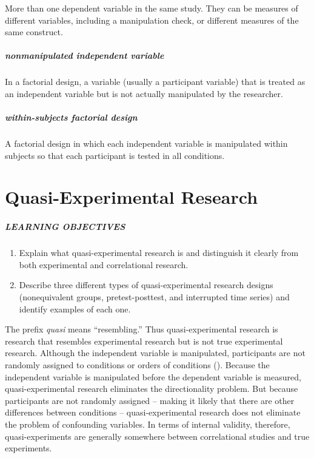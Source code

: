 \documentclass[
]{krantz}
\providecommand{\tightlist}{%
  \setlength{\itemsep}{0pt}\setlength{\parskip}{0pt}}
\begin{document}
More than one dependent variable in the same study. They can be measures of different variables, including a manipulation check, or different measures of the same construct.

\paragraph*{nonmanipulated independent variable}\label{nonmanipulated-independent-variable}

In a factorial design, a variable (usually a participant variable) that is treated as an independent variable but is not actually manipulated by the researcher.

\paragraph*{within-subjects factorial design}\label{within-subjects-factorial-design}

A factorial design in which each independent variable is manipulated within subjects so that each participant is tested in all conditions.

\chapter{Quasi-Experimental Research}\label{quasi-experimental-research}

\paragraph*{LEARNING OBJECTIVES}\label{learning-objectives-16}

\begin{enumerate}
\def\labelenumi{\arabic{enumi}.}
\tightlist
\item
  Explain what quasi-experimental research is and distinguish it clearly from both experimental and correlational research.
\item
  Describe three different types of quasi-experimental research designs (nonequivalent groups, pretest-posttest, and interrupted time series) and identify examples of each one.
\end{enumerate}

The prefix \emph{quasi} means ``resembling.'' Thus quasi-experimental research is research that resembles experimental research but is not true experimental research. Although the independent variable is manipulated, participants are not randomly assigned to conditions or orders of conditions (). Because the independent variable is manipulated before the dependent variable is measured, quasi-experimental research eliminates the directionality problem. But because participants are not randomly assigned -- making it likely that there are other differences between conditions -- quasi-experimental research does not eliminate the problem of confounding variables. In terms of internal validity, therefore, quasi-experiments are generally somewhere between correlational studies and true experiments.
\end{document}
